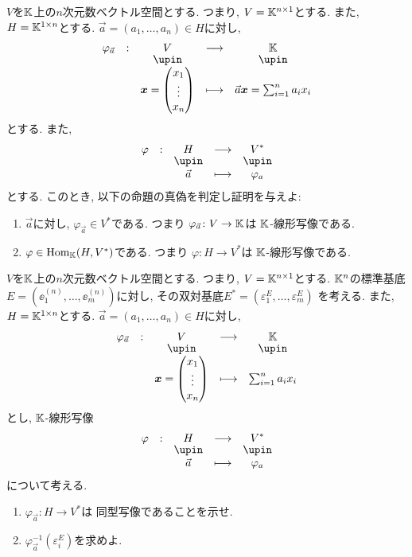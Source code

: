 \begin{quiz}
  $V$を$\mathbb{K}$上の$n$次元数ベクトル空間とする.
  つまり,
  $V=\mathbb{K}^{n \times 1}$とする.
  また,
  $H=\mathbb{K}^{1 \times n}$とする.
  $\vec{a}=(a_1,\ldots,a_n)\in H$に対し,
  \begin{align*}
    \shazo{\varphi_{\vec{a}}}{V}{\KK}
          {\xx=\begin{pmatrix}x_1\\\vdots\\x_n\end{pmatrix}}
          {\vec{a}\xx=\sum_{i=1}^na_ix_i}
  \end{align*}
  とする.
  また,
  \begin{align*}
    \shazo{\varphi}{H}{V^\ast}
          {\vec{a}}{\varphi_a}
  \end{align*}
  とする.
  このとき,
  以下の命題の真偽を判定し証明を与えよ:
  \begin{enumerate}
  \item
    $\vec{a}$に対し,
    $\varphi_{\vec{a}}\in V^\ast$である.
    つまり
    $\varphi_{\vec{a}}\colon V\to \mathbb{K}$は
    $\mathbb{K}$-線形写像である.
  \item
    $\varphi\in \operatorname{Hom}_{\mathbb{K}}(H,V^\ast)$である.
    つまり
    $\varphi\colon H\to V^\ast$は
    $\mathbb{K}$-線形写像である.
  \end{enumerate}
\end{quiz}
\begin{quiz}
  $V$を$\mathbb{K}$上の$n$次元数ベクトル空間とする.
  つまり,
  $V=\mathbb{K}^{n \times 1}$とする.
  $\mathbb{K}^n$の標準基底$E=(\ee^{(n)}_1,\ldots,\ee^{(n)}_m)$に対し,
  その双対基底$E^\ast=(\varepsilon_1^{E},\ldots,\varepsilon_m^{E})$
  を考える.
  また,
  $H=\mathbb{K}^{1 \times n}$とする.
  $\vec{a}=(a_1,\ldots,a_n)\in H$に対し,
  \begin{align*}
    \shazo{\varphi_{\vec{a}}}{V}{\KK}
          {\xx=\begin{pmatrix}x_1\\\vdots\\x_n\end{pmatrix}}
          {\sum_{i=1}^na_ix_i}
  \end{align*}
  とし,
  $\mathbb{K}$-線形写像
  \begin{align*}
    \shazo{\varphi}{H}{V^\ast}
          {\vec{a}}{\varphi_a}
  \end{align*}
  について考える.
  \begin{enumerate}
  \item
    $\varphi_{\vec{a}}\colon H\to V^\ast$は
    同型写像であることを示せ.
  \item
    $\varphi_{\vec{a}}^{-1}(\varepsilon^{E}_i)$を求めよ.
  \end{enumerate}
\end{quiz}


